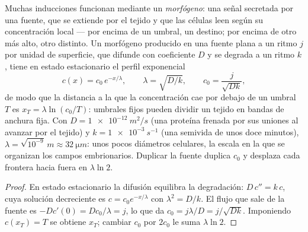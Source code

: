 \begin{theorem}\label{thm:b2:vertebrate-development:gradient}
Muchas inducciones funcionan mediante un \emph{morfógeno}: una señal
secretada por una fuente, que se extiende por el tejido y que las células
leen según su concentración local --- por encima de un umbral, un
destino; por encima de otro más alto, otro distinto. Un morfógeno
producido en una fuente plana a un ritmo $j$ por unidad de superficie,
que difunde con coeficiente $D$ y se degrada a un ritmo $k$, tiene en
estado estacionario el perfil exponencial
\[
c(x) = c_0\,e^{-x/\lambda}, \qquad \lambda = \sqrt{D/k}, \qquad c_0 = \frac{j}{\sqrt{Dk}},
\]
de modo que la distancia a la que la concentración cae por debajo de un
umbral $T$ es $x_T = \lambda\ln(c_0/T)$: umbrales fijos pueden dividir un
tejido en bandas de anchura fija. Con $D =
\qty{1e-12}{m^2/s}$ (una proteína frenada por sus uniones al avanzar por
el tejido) y $k = \qty{1e-3}{s^{-1}}$ (una semivida de unos doce
minutos), $\lambda = \sqrt{10^{-9}}\,\unit{m} \approx
\qty{32}{\micro m}$: unos pocos diámetros celulares, la escala en la que
se organizan los campos embrionarios. Duplicar la fuente duplica $c_0$ y
desplaza cada frontera hacia fuera en $\lambda
\ln 2$.
\end{theorem}
\begin{proof}
En estado estacionario la difusión equilibra la degradación: $D\,c'' = k\,c$,
cuya solución decreciente es $c = c_0 e^{-x/\lambda}$ con $\lambda^2 =
D/k$. El flujo que sale de la fuente es $-Dc'(0) = Dc_0/\lambda = j$,
lo que da $c_0 = j\lambda/D = j/\sqrt{Dk}$. Imponiendo $c(x_T) = T$
se obtiene $x_T$; cambiar $c_0$ por $2c_0$ le suma $\lambda\ln 2$.
\end{proof}

